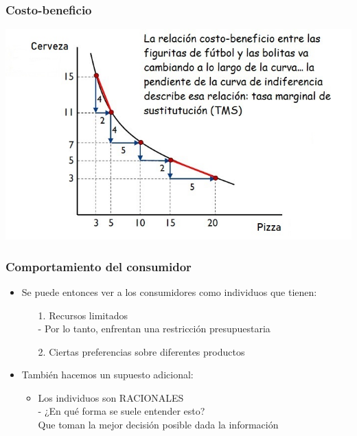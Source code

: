 \documentclass{beamer}
\begin{document}
\begin{frame}
\frametitle{ Costo-beneficio}
\centering
\includegraphics[scale=0.65]{Figures/Tema_02.17_rp15.jpg}
\end{frame}

\begin{frame}
\frametitle{ Comportamiento del consumidor}
\begin{itemize}
    \item Se puede entonces ver a los consumidores como individuos que tienen: \vspace{2mm}
    \begin{itemize}
        \item[1.] Recursos limitados \\
        - Por lo tanto, enfrentan una restricción presupuestaria \vspace{2mm}
        \item[2.] Ciertas preferencias sobre diferentes productos \\ \vspace{2mm}
    \end{itemize}
    \item También hacemos un supuesto adicional: \vspace{2mm}
    \begin{itemize}
    \item Los individuos son RACIONALES \\ \vspace{2mm}
    - ¿En qué forma se suele entender esto?
      \\ Que toman la mejor decisión posible dada la información
    \end{itemize}
\end{itemize} 
\end{frame}
\end{document}
